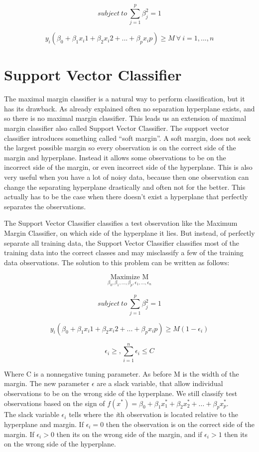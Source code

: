 $$subject\: to\:\sum\limits_{j=1}^{p} \beta_j^2 = 1$$

$$y_i(\beta_0 + \beta_1 x_i1 + \beta_2 x_i2 + ... + \beta_p x_ip)  \geq  M\: \forall\: i=1,...,n$$

\section{Support Vector Classifier}
The maximal margin classifier is a natural way to perform classification, but it has its drawback. As already explained often no separation hyperplane exists, and so there is no maximal margin classifier. This leads us an extension of maximal margin classifier also called Support Vector Classifier.  
The support vector classifier introduces something called “soft margin”. A soft margin, does not seek the largest possible margin so every observation is on the correct side of the margin and hyperplane. Instead it allows some observations to be on the incorrect side of the margin, or even incorrect side of the hyperplane. This is also very useful when you have a lot of noisy data, because then one observation can change the separating hyperplane drastically and often not for the better.  
This actually has to be the case when there doesn’t exist a hyperplane that perfectly separates the observations. 

The Support Vector Classifier classifies a test observation like the Maximum Margin Classifier, on which side of the hyperplane it lies. But instead, of perfectly separate all training data, the Support Vector Classifier classifies most of the training data into the correct classes and may misclassify a few of the training data observations. The solution to this problem can be written as follows: 

$$\underset{\beta_0 ,\beta_1 ,...,\beta_p, \epsilon_1,...,\epsilon_n}{\text{Maximize M}}$$

$$subject\: to\:\sum\limits_{j=1}^{p} \beta_j^2 = 1$$

$$y_i(\beta_0 + \beta_1 x_i1 + \beta_2 x_i2 + ... + \beta_p x_ip)  \geq  M(1-\epsilon_i)$$

$$\epsilon_i \geq, \sum_{i=1}^{n}\epsilon_i \leq C$$

Where C is a nonnegative tuning parameter. As before M is the width of the margin. The new parameter $\epsilon $ are a slack variable, that allow individual observations to be on the wrong side of the hyperplane. We still classify test observations based on the sign of $f(x^*) = \beta_0 + \beta_1 x_1^* + \beta_2 x_2^* + ... + \beta_p x_p^*$. \\
The slack variable $\epsilon_i $ tells where the \textit{i}th observation is located relative to the hyperplane and margin. If $\epsilon_i = 0$ then the observation is on the correct side of the margin. If $\epsilon_i > 0$ then its on the wrong side of the margin, and if $\epsilon_i > 1$ then its on the wrong side of the hyperplane. 

